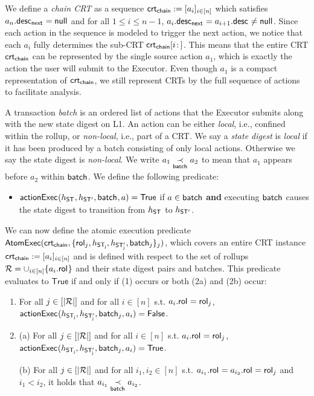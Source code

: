We define a \emph{chain CRT} as a sequence $\mathsf{crt_{chain}} := [a_i]_{i \in [n]}$ which satisfies $a_n.\mathsf{desc_{next}}_{} = \mathsf{null}$ and for all $1 \leq i \leq n-1$, \; $a_i.\mathsf{desc_{next}}_{} = a_{i+1}.\mathsf{desc}_{} \neq \mathsf{null}$. Since each action in the sequence is modeled to trigger the next action, we notice that each $a_i$ fully determines the sub-CRT $\mathsf{crt_{chain}} [i\colon \! ]$. This means that the entire CRT $\mathsf{crt_{chain}}$ can be represented by the single source action $a_1$, which is exactly the action the user will submit to the Executor. Even though $a_1$ is a compact representation of $\mathsf{crt_{chain}}$, we still represent CRTs by the full sequence of actions to facilitate analysis. 


A transaction \emph{batch} is an ordered list of actions that the Executor submits along with the new state digest on L1. An action can be either \emph{local}, i.e., confined within the rollup, or \emph{non-local}, i.e., part of a CRT. 
We say a \emph{state digest} is \emph{local} if it has been produced by a batch consisting of only local actions. Otherwise we say the state digest is \emph{non-local}. We write $a_1 \underset{\mathsf{batch}_{}}{\prec} a_2$ to mean that $a_1$ appears before $a_2$ within $\mathsf{batch}_{}$.
We define the following predicate:
\begin{itemize}[leftmargin=*]
    \item $\mathsf{actionExec}_{}(h_{\mathsf{ST_{}}}, h_{\mathsf{ST_{}'}}, \mathsf{batch}_{}, a) = \mathsf{True}$ if $a \in \mathsf{batch}_{}$ \textbf{and} executing $\mathsf{batch}_{}$ causes the state digest to transition from $h_{\mathsf{ST_{}}}$ to $h_{\mathsf{ST_{}'}}$.
\end{itemize}

We can now define the atomic execution predicate $\mathsf{AtomExec}(\mathsf{crt_{chain}}, \{\mathsf{rol}_{j}, h_{\mathsf{ST_{j}}}, h_{\mathsf{ST_{j}'}}, \mathsf{batch}_{j}\}_j)$, which covers an entire CRT instance $\mathsf{crt_{chain}} := [a_i]_{i \in [n]}$ and is defined with respect to the set of rollups $\mathcal{R} = \cup_{i \in [n]} \{ a_i.\mathsf{rol}_{} \}$ and their state digest pairs and batches.
This predicate evaluates to $\mathsf{True}$ if and only if (1) occurs or both (2a) and (2b) occur:
\begin{enumerate}[leftmargin=*]
    \item For all $j \in [|\mathcal{R}|]$ and for all $i \in [n]$ s.t. $a_i.\mathsf{rol}_{} = \mathsf{rol}_{j}$, $\mathsf{actionExec}_{}(h_{\mathsf{ST_{j}}}, h_{\mathsf{ST_{j}'}}, \mathsf{batch}_{j}, a_i) = \mathsf{False}$.
    \item (a) For all $j \in [|\mathcal{R}|]$ and for all $i \in [n]$ s.t. $a_i.\mathsf{rol}_{} = \mathsf{rol}_{j}$,
            $\mathsf{actionExec}_{}(h_{\mathsf{ST_{j}}}, h_{\mathsf{ST_{j}'}}, \mathsf{batch}_{j}, a_i) = \mathsf{True}$.
            
        (b) For all $j \in [|\mathcal{R}|]$ and for all $i_1, i_2 \in [n]$ s.t. $a_{i_1}.\mathsf{rol}_{} = a_{i_2}.\mathsf{rol}_{} = \mathsf{rol}_{j}$ and $i_1 < i_2 $, it holds that $a_{i_1} \underset{\mathsf{batch}_{}}{\prec} a_{i_2}$.
\end{enumerate}

